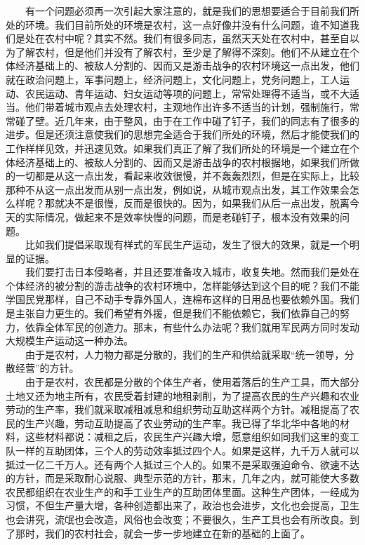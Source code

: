 \documentclass[cn,11pt,chinese]{elegantbook}
\begin{document}
　　有一个问题必须再一次引起大家注意的，就是我们的思想要适合于目前我们所处的环境。我们目前所处的环境是农村，这一点好像并没有什么问题，谁不知道我们是处在农村中呢？其实不然。我们有很多同志，虽然天天处在农村中，甚至自以为了解农村，但是他们并没有了解农村，至少是了解得不深刻。他们不从建立在个体经济基础上的、被敌人分割的、因而又是游击战争的农村环境这一点出发，他们就在政治问题上，军事问题上，经济问题上，文化问题上，党务问题上，工人运动、农民运动、青年运动、妇女运动等项的问题上，常常处理得不适当，或不大适当。他们带着城市观点去处理农村，主观地作出许多不适当的计划，强制施行，常常碰了壁。近几年来，由于整风，由于在工作中碰了钉子，我们的同志有了很多的进步。但是还须注意使我们的思想完全适合于我们所处的环境，然后才能使我们的工作样样见效，并迅速见效。如果我们真正了解了我们所处的环境是一个建立在个体经济基础上的、被敌人分割的、因而又是游击战争的农村根据地，如果我们所做的一切都是从这一点出发，看起来收效很慢，并不轰轰烈烈，但是在实际上，比较那种不从这一点出发而从别一点出发，例如说，从城市观点出发，其工作效果会怎么样呢？那就决不是很慢，反而是很快的。因为，如果我们从后一点出发，脱离今天的实际情况，做起来不是效率快慢的问题，而是老碰钉子，根本没有效果的问题。\\
　　比如我们提倡采取现有样式的军民生产运动，发生了很大的效果，就是一个明显的证据。\\
　　我们要打击日本侵略者，并且还要准备攻入城市，收复失地。然而我们是处在个体经济的被分割的游击战争的农村环境中，怎样能够达到这个目的呢？我们不能学国民党那样，自己不动手专靠外国人，连棉布这样的日用品也要依赖外国。我们是主张自力更生的。我们希望有外援，但是我们不能依赖它，我们依靠自己的努力，依靠全体军民的创造力。那末，有些什么办法呢？我们就用军民两方同时发动大规模生产运动这一种办法。\\
　　由于是农村，人力物力都是分散的，我们的生产和供给就采取“统一领导，分散经营”的方针。\\
　　由于是农村，农民都是分散的个体生产者，使用着落后的生产工具，而大部分土地又还为地主所有，农民受着封建的地租剥削，为了提高农民的生产兴趣和农业劳动的生产率，我们就采取减租减息和组织劳动互助这样两个方针。减租提高了农民的生产兴趣，劳动互助提高了农业劳动的生产率。我已得了华北华中各地的材料，这些材料都说：减租之后，农民生产兴趣大增，愿意组织如同我们这里的变工队一样的互助团体，三个人的劳动效率抵过四个人。如果是这样，九千万人就可以抵过一亿二千万人。还有两个人抵过三个人的。如果不是采取强迫命令、欲速不达的方针，而是采取耐心说服、典型示范的方针，那末，几年之内，就可能使大多数农民都组织在农业生产的和手工业生产的互助团体里面。这种生产团体，一经成为习惯，不但生产量大增，各种创造都出来了，政治也会进步，文化也会提高，卫生也会讲究，流氓也会改造，风俗也会改变；不要很久，生产工具也会有所改良。到了那时，我们的农村社会，就会一步一步地建立在新的基础的上面了。\\
\end{document}
